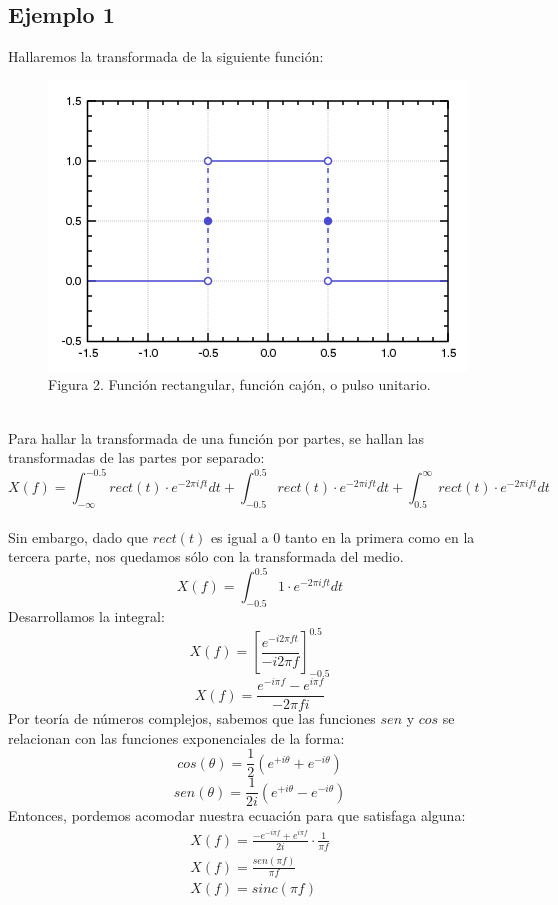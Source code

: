 \documentclass[review,1p]{elsarticle}
\begin{document}
\subsection{Ejemplo 1}
Hallaremos la transformada de la siguiente función:\\
\begin{figure}[h]
    \centering
    \includegraphics[scale=0.5]{Figuras/Funcion_cajon.png}
    \\
    \small Figura 2. Función rectangular, función cajón, o pulso unitario.\\
\end{figure}\\
Para hallar la transformada de una función por partes, se hallan las transformadas
de las partes por separado:\\
\[
    X(f) = \int_{- \infty}^{-0.5} rect(t) \cdot e^{-2\pi ift} dt +
    \int_{-0.5}^{0.5} rect(t) \cdot e^{-2\pi ift} dt + 
    \int_{0.5}^{\infty} rect(t) \cdot e^{-2\pi ift} dt
\]
\\
Sin embargo, dado que $rect(t)$ es igual a 0 tanto en la primera como en la
tercera parte, nos quedamos sólo con la transformada del medio.\\
\[
    X(f) = \int_{-0.5}^{0.5} 1\cdot e^{-2\pi ift} dt
\]
Desarrollamos la integral:\\
\[
    X(f) = [\frac{e^{-i2\pi ft}}{-i2\pi f}]_{-0.5}^{0.5}
\]
\[
    X(f) = \frac{e^{-i\pi f} - e^{i\pi f} }{-2\pi fi}  
\]
Por teoría de números complejos, sabemos que las funciones $sen$ y $cos$ se
relacionan con las funciones exponenciales de la forma:\\
\begin{equation}
    cos(\theta) = \frac{1}{2}(e^{+i\theta}+e^{-i\theta})
\end{equation}
\begin{equation}
    sen(\theta) = \frac{1}{2i}(e^{+i\theta}-e^{-i\theta})
\end{equation}
Entonces, pordemos acomodar nuestra ecuación para que satisfaga alguna:\\
\begin{align*}
    X(f) = \frac{-e^{-i\pi f} + e^{i\pi f}}{2i} \cdot \frac{1}{\pi f}\\
    X(f) = \frac{sen(\pi f)}{\pi f}  \\
    X(f) = sinc(\pi f)\\
\end{align*}
  
\end{document}
